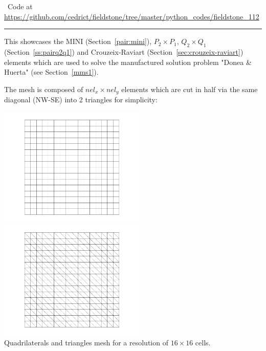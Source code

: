 

\begin{center}
\inpython~Code at \url{https://github.com/cedrict/fieldstone/tree/master/python_codes/fieldstone_112}
\end{center}

\par\noindent\rule{\textwidth}{0.4pt}



This \stone showcases the MINI (Section~\ref{pair:mini}), 
$P_2\times P_1$, $Q_2\times Q_1$ (Section~\ref{ss:pairq2q1}) 
and Crouzeix-Raviart  (Section~\ref{sec:crouzeix-raviart})
elements which are used to solve the manufactured solution problem "Donea \& Huerta" (see Section~\ref{mms1}).

The mesh is composed of $nel_x \times nel_y$ elements which are cut in half via the same diagonal (NW-SE) into 2 triangles
for simplicity: 

\begin{center}
\includegraphics[width=7cm]{python_codes/fieldstone_112/results/grid_quads}
\includegraphics[width=7cm]{python_codes/fieldstone_112/results/grid_triangles}\\
{\captionfont Quadrilaterals and triangles mesh for a resolution of $16\times 16$ cells.} 
\end{center}

